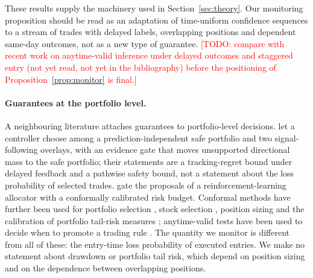 \documentclass[11pt]{article}
\theoremstyle{remark}
\newcommand{\todo}[1]{\textcolor{red}{[TODO: #1]}}
\begin{document}
These results supply the machinery used in Section~\ref{sec:theory}. Our monitoring proposition
should be read as an adaptation of time-uniform confidence sequences to a stream of trades with
delayed labels, overlapping positions and dependent same-day outcomes, not as a new type of
guarantee.
\todo{compare with recent work on anytime-valid inference under delayed outcomes and staggered
entry (not yet read, not yet in the bibliography) before the positioning of
Proposition~\ref{prop:monitor} is final.}

\paragraph{Guarantees at the portfolio level.}
A neighbouring literature attaches guarantees to portfolio-level decisions.
\citet{mohammadpourazari2026safe} let a controller choose among a prediction-independent safe
portfolio and two signal-following overlays, with an evidence gate that moves unsupported
directional mass to the safe portfolio; their statements are a tracking-regret bound under
delayed feedback and a pathwise safety bound, not a statement about the loss probability of
selected trades.
\citet{zarei2026conformal} gate the proposals of a reinforcement-learning allocator with a
conformally calibrated risk budget. Conformal methods have further been used for portfolio
selection \citep{kato2024conformal}, stock selection \citep{kaya2025conformal}, position sizing
\citep{ryan2026conformalkelly} and the calibration of portfolio tail-risk measures
\citep{schmitt2026taming,chen2026cvar}; anytime-valid tests have been used to decide when to
promote a trading rule \citep{benhamou2026promote}. The quantity we monitor is different from
all of these: the entry-time loss probability of executed entries. We make no statement about
drawdown or portfolio tail risk, which depend on position sizing and on the dependence between
overlapping positions.
\end{document}
